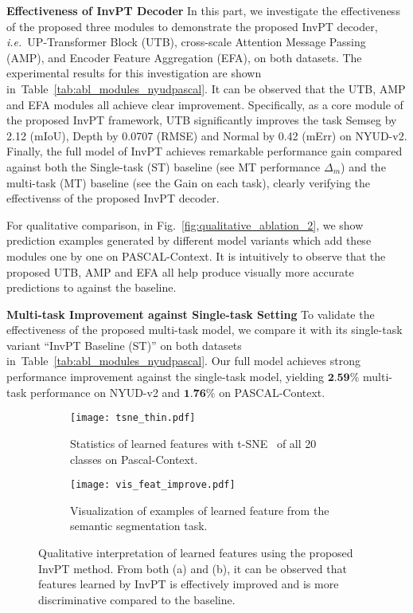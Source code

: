 \documentclass[runningheads]{llncs}
\newcommand*{\ie}{\emph{i.e.}}
\begin{document}
\par\noindent\textbf{Effectiveness of InvPT Decoder}
In this part, we investigate the effectiveness of the proposed three modules to demonstrate the proposed InvPT decoder, \ie~UP-Transformer Block (UTB), cross-scale Attention Message Passing (AMP), and Encoder Feature Aggregation (EFA), on both datasets. The experimental results for this investigation are shown in~Table~\ref{tab:abl_modules_nyudpascal}. It can be observed that the UTB, AMP and EFA modules all achieve clear improvement. Specifically, as a core module of the proposed InvPT framework, UTB significantly improves the task Semseg by 2.12 (mIoU), Depth by 0.0707 (RMSE) and Normal by 0.42 (mErr) on NYUD-v2.
Finally, the full model of InvPT achieves remarkable performance gain compared against both the Single-task (ST) baseline (see MT performance $\Delta_m$) and the multi-task (MT) baseline (see the Gain on each task), clearly verifying the effectivenss of the proposed InvPT decoder.
\par For qualitative comparison, in Fig.~\ref{fig:qualitative_ablation_2}, we show prediction examples generated by different model variants which add these modules one by one on PASCAL-Context. It is intuitively to observe that the proposed UTB, AMP and EFA all help produce visually more accurate predictions to against the baseline.

\vspace{3pt}
\par\noindent\textbf{Multi-task Improvement against Single-task Setting}
To validate the effectiveness of the proposed multi-task model, we compare it with its single-task variant ``InvPT Baseline (ST)'' on both datasets in~Table~\ref{tab:abl_modules_nyudpascal}.
Our full model achieves strong performance improvement against the single-task model, yielding $\textbf{2.59\%}$ multi-task performance on NYUD-v2 and $\textbf{1.76\%}$ on PASCAL-Context.


\begin{figure}[t]
\centering
\vspace{-5pt}
\begin{subfigure}[t]{\textwidth}
    \centering
    \texttt{[image: tsne\_thin.pdf]}
    \caption{Statistics of learned features with t-SNE~\cite{van2008visualizing} of all 20 classes on Pascal-Context.}
    \label{fig:tsne}
\end{subfigure}

\begin{subfigure}[t]{\textwidth}
    \centering
    \texttt{[image: vis\_feat\_improve.pdf]}
    \caption{Visualization of examples of learned feature from the semantic segmentation task.}
    \label{fig:featimprove}
\vspace{-8pt}
\end{subfigure}
\caption{Qualitative interpretation of learned features using the proposed InvPT method. From both (a) and (b), it can be observed that features learned by InvPT is effectively improved and is more discriminative compared to the baseline.}
\label{fig:tsne_featimprove}
\vspace{-18pt}
\end{figure}
\end{document}
